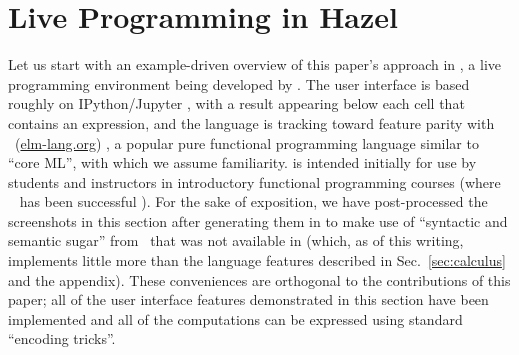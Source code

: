 \newcommand{\examplesSec}{Live Programming in Hazel}
\section{\examplesSec} 
\label{sec:examples}




\newcommand{\overviewExample}[2]{\paragraph{Example {#1}: {#2}}}

Let us start with an example-driven overview of this paper's approach in \Hazel, a live programming environment being developed by \citet{HazelnutSNAPL}. The \Hazel user interface is based roughly on IPython/Jupyter \cite{PER-GRA:2007}, with a result appearing below each cell that contains an expression, and the \Hazel language is tracking toward feature parity with \Elm~(\url{elm-lang.org}) \cite{czaplicki2012elm,Elm}, a popular pure functional programming language similar to ``core ML'', with which we assume familiarity. \Hazel is intended initially for use by students and instructors in introductory functional programming courses (where \Elm~ has been successful \cite{DBLP:journals/corr/abs-1805-05125}). 
For the sake of 
exposition, we have post-processed the screenshots in this section after generating them in \Hazel to make use of  ``syntactic and semantic sugar'' from \Elm~that was not available in \Hazel (which, as of this writing, implements little more than the language features described in Sec.~\ref{sec:calculus} and the appendix). These conveniences are orthogonal to the contributions of this paper; all of the user interface features demonstrated in this section have been implemented and all of the computations can be expressed using standard ``encoding tricks''.








